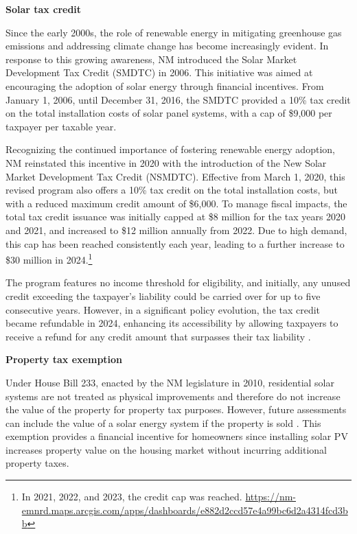 \documentclass[11pt,twoside,letterpaper]{article}
\begin{document}
\textbf{Solar tax credit}

Since the early 2000s, the role of renewable energy in mitigating greenhouse gas emissions and addressing climate change has become increasingly evident. In response to this growing awareness, NM introduced the Solar Market Development Tax Credit (SMDTC) in 2006. This initiative was aimed at encouraging the adoption of solar energy through financial incentives. From January 1, 2006, until December 31, 2016, the SMDTC provided a 10\% tax credit on the total installation costs of solar panel systems, with a cap of \$9,000 per taxpayer per taxable year. 

Recognizing the continued importance of fostering renewable energy adoption, NM reinstated this incentive in 2020 with the introduction of the New Solar Market Development Tax Credit (NSMDTC). Effective from March 1, 2020, this revised program also offers a 10\% tax credit on the total installation costs, but with a reduced maximum credit amount of \$6,000. To manage fiscal impacts, the total tax credit issuance was initially capped at \$8 million for the tax years 2020 and 2021, and increased to \$12 million annually from 2022. Due to high demand, this cap has been reached consistently each year, leading to a further increase to \$30 million in 2024.\footnote{In 2021, 2022, and 2023, the credit cap was reached. \url{https://nm-emnrd.maps.arcgis.com/apps/dashboards/e882d2ccd57e4a99bc6d2a4314fcd3bb}}

The program features no income threshold for eligibility, and initially, any unused credit exceeding the taxpayer’s liability could be carried over for up to five consecutive years. However, in a significant policy evolution, the tax credit became refundable in 2024, enhancing its accessibility by allowing taxpayers to receive a refund for any credit amount that surpasses their tax liability \parencite{nmsmdtc}.

\noindent\textbf{Property tax exemption}

Under House Bill 233, enacted by the NM legislature in 2010, residential solar systems are not treated as physical improvements and therefore do not increase the value of the property for property tax purposes. However, future assessments can include the value of a solar energy system if the property is sold \parencite{propertytax}. This exemption provides a financial incentive for homeowners since installing solar PV increases property value on the housing market without incurring additional property taxes.
\end{document}
